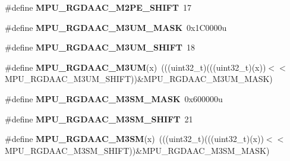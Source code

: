\begin{DoxyCompactItemize}
\item 
\#define {\bfseries M\+P\+U\+\_\+\+R\+G\+D\+A\+A\+C\+\_\+\+M2\+P\+E\+\_\+\+S\+H\+I\+FT}~17\hypertarget{group__MPU__Register__Masks_gaaf75f6361f7eb3bc6210018bd8c99468}{}\label{group__MPU__Register__Masks_gaaf75f6361f7eb3bc6210018bd8c99468}

\item 
\#define {\bfseries M\+P\+U\+\_\+\+R\+G\+D\+A\+A\+C\+\_\+\+M3\+U\+M\+\_\+\+M\+A\+SK}~0x1\+C0000u\hypertarget{group__MPU__Register__Masks_gaf2452a83e10e064460faa1161376e227}{}\label{group__MPU__Register__Masks_gaf2452a83e10e064460faa1161376e227}

\item 
\#define {\bfseries M\+P\+U\+\_\+\+R\+G\+D\+A\+A\+C\+\_\+\+M3\+U\+M\+\_\+\+S\+H\+I\+FT}~18\hypertarget{group__MPU__Register__Masks_gac64ad669637020d4ed932759c5018a1a}{}\label{group__MPU__Register__Masks_gac64ad669637020d4ed932759c5018a1a}

\item 
\#define {\bfseries M\+P\+U\+\_\+\+R\+G\+D\+A\+A\+C\+\_\+\+M3\+UM}(x)~(((uint32\+\_\+t)(((uint32\+\_\+t)(x))$<$$<$M\+P\+U\+\_\+\+R\+G\+D\+A\+A\+C\+\_\+\+M3\+U\+M\+\_\+\+S\+H\+I\+FT))\&M\+P\+U\+\_\+\+R\+G\+D\+A\+A\+C\+\_\+\+M3\+U\+M\+\_\+\+M\+A\+SK)\hypertarget{group__MPU__Register__Masks_ga76fc460cd33e038041b5a57af773d35c}{}\label{group__MPU__Register__Masks_ga76fc460cd33e038041b5a57af773d35c}

\item 
\#define {\bfseries M\+P\+U\+\_\+\+R\+G\+D\+A\+A\+C\+\_\+\+M3\+S\+M\+\_\+\+M\+A\+SK}~0x600000u\hypertarget{group__MPU__Register__Masks_gae5e6d54ab5d669ec57740a22ea1a9840}{}\label{group__MPU__Register__Masks_gae5e6d54ab5d669ec57740a22ea1a9840}

\item 
\#define {\bfseries M\+P\+U\+\_\+\+R\+G\+D\+A\+A\+C\+\_\+\+M3\+S\+M\+\_\+\+S\+H\+I\+FT}~21\hypertarget{group__MPU__Register__Masks_ga2100b16ac6437948090913ee54184df6}{}\label{group__MPU__Register__Masks_ga2100b16ac6437948090913ee54184df6}

\item 
\#define {\bfseries M\+P\+U\+\_\+\+R\+G\+D\+A\+A\+C\+\_\+\+M3\+SM}(x)~(((uint32\+\_\+t)(((uint32\+\_\+t)(x))$<$$<$M\+P\+U\+\_\+\+R\+G\+D\+A\+A\+C\+\_\+\+M3\+S\+M\+\_\+\+S\+H\+I\+FT))\&M\+P\+U\+\_\+\+R\+G\+D\+A\+A\+C\+\_\+\+M3\+S\+M\+\_\+\+M\+A\+SK)\hypertarget{group__MPU__Register__Masks_gaa774f8f68a43dac17f60bc8572fb5b4f}{}\label{group__MPU__Register__Masks_gaa774f8f68a43dac17f60bc8572fb5b4f}


\end{DoxyCompactItemize}
